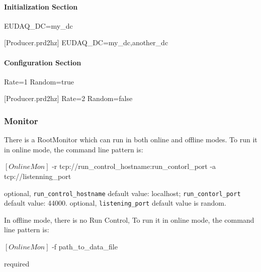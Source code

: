 \paragraph{Initialization Section}
\begin{listing}
EUDAQ_DC=my_dc

[Producer.prd2hz]
EUDAQ_DC=my_dc,another_dc
\end{listing}

\paragraph{Configuration Section}
\begin{listing}
Rate=1
Random=true

[Producer.prd2hz]
Rate=2
Random=false
\end{listing}


\subsubsection{Monitor}
\label{sec:onlinemonitor}
There is a RootMonitor which can run in both online and offline modes.
To run it in online mode, the command line pattern is:
\begin{listing}[mybash]
$[OnlineMon]$ -r tcp://{run_control_hostname}:{run_contorl_port} -a tcp://{listenning_port}
\end{listing}

\begin{description}
optional, \texttt{run\_control\_hostname} default value: localhost;  \texttt{run\_contorl\_port}  default value: 44000.
optional, \texttt{listening\_port} default value is random.
\end{description}

In offline mode, there is no Run Control, To run it in online mode, the command line pattern is:
\begin{listing}[mybash]
$[OnlineMon]$ -f {path_to_data_file}
\end{listing}

\begin{description}
required
\end{description}


